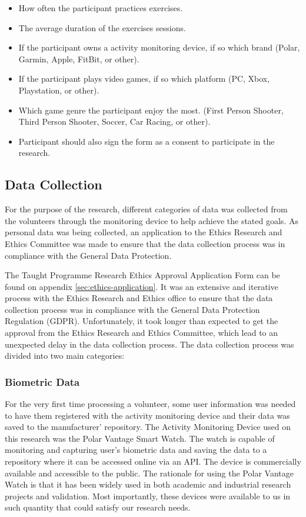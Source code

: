 \begin{itemize}
    \item How often the participant practices exercises.
    \item The average duration of the exercises sessions.
    \item If the participant owns a activity monitoring device, if so which brand (Polar, Garmin, Apple, FitBit, or other).
    \item If the participant plays video games, if so which platform (PC, Xbox, Playstation, or other).
    \item Which game genre the participant enjoy the most. (First Person Shooter, Third Person Shooter, Soccer, Car Racing, or other).
    \item Participant should also sign the form as a consent to participate in the research.
\end{itemize}

\subsection{Data Collection}

For the purpose of the research, different categories of data was collected from the volunteers through the monitoring device to help achieve the stated goals. As personal data was
being collected, an application to the Ethics Research and Ethics Committee was made to ensure that the data collection process was in compliance with the General Data Protection.

\par 
The Taught Programme Research Ethics Approval Application Form can be found on appendix \ref{sec:ethics-application}. It was an extensive and iterative process with the Ethics Research and Ethics 
office to ensure that the data collection process was in compliance with the General Data Protection Regulation (GDPR). Unfortunately, it took longer than expected to get the approval
from the Ethics Research and Ethics Committee, which lead to an unexpected delay in the data collection process. The data collection process was divided into two main categories:

\subsubsection*{Biometric Data}

For the very first time processing a volunteer, some user information was needed to have them registered with the activity monitoring device and their data was saved to the manufacturer'
repository. The Activity Monitoring Device used on this research was the Polar Vantage Smart Watch. The watch is capable of monitoring and capturing user’s biometric data and saving the
data to a repository where it can be accessed online via an API. The device is commercially available and accessible to the public. The rationale for using the Polar Vantage Watch is
that it has been widely used in both academic and industrial research projects and validation. Most importantly, these devices were available to us in such quantity that could satisfy
our research needs.

